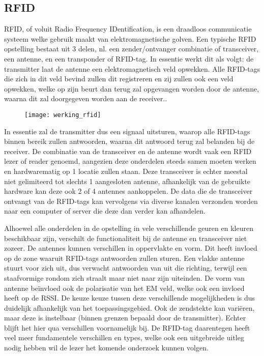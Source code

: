 \subsection{RFID}
\label{sec:RFID}
RFID, of voluit Radio Frequency IDentification, is een draadloos communicatie systeem welke gebruik maakt van elektromagnetische golven. Een typische RFID opstelling bestaat uit 3 delen, nl. een zender/ontvanger combinatie of transceiver, een antenne, en een transponder of RFID-tag.\autocite{Auxcis2022} In essentie werkt dit als volgt: de transmitter laat de antenne een elektromagnetisch veld opwekken. Alle RFID-tags die zich in dit veld bevind zullen dit registreren en zij zullen ook een veld opwekken, welke op zijn beurt dan terug zal opgevangen worden door de antenne, waarna dit zal doorgegeven worden aan de receiver.. 
\begin{figure}[h]
\texttt{[image: werking\_rfid]}
\centering
\end{figure}
In essentie zal de transmitter dus een signaal uitsturen, waarop alle RFID-tags binnen bereik zullen antwoorden, waarna dit antwoord terug zal belanden bij de receiver. De combinatie van de transceiver en de antenne wordt vaak een RFID lezer of reader genoemd, aangezien deze onderdelen steeds samen moeten werken en hardwarematig op 1 locatie zullen staan.\autocite{Amster2021}
Deze transceiver is echter meestal niet gelimiteerd tot slechts 1 aangesloten antenne, afhankelijk van de gebruikte hardware kan deze ook 2 of 4 antennes aankoppelen. De data die de transceiver ontvangt van de RFID-tags kan vervolgens via diverse kanalen verzonden worden naar een computer of server die deze dan verder kan afhandelen.

Alhoewel alle onderdelen in de opstelling in vele verschillende geuren en kleuren beschikbaar zijn, verschilt de functionaliteit bij de antenne en transceiver niet zozeer. De antennes kunnen verschillen in oppervlakte en vorm. Dit heeft invloed op de zone waaruit RFID-tags antwoorden zullen sturen. Een vlakke antenne stuurt voor zich uit, dus verwacht antwoorden van uit die richting, terwijl een staafvormige rondom zich straalt maar niet naar zijn uiteinden. De vorm van antenne beïnvloed ook de polarisatie van het EM veld, welke ook een invloed heeft op de RSSI. De keuze keuze tussen deze verschillende mogelijkheden is dus duidelijk afhankelijk van het toepassingsgebied. Ook de zendstekte kan variëren, maar deze is instelbaar (binnen grenzen bepaald door de transmitter). Echter blijft het hier qua verschillen voornamelijk bij. De RFID-tag daarentegen heeft veel meer fundamentele verschillen en types, welke ook een uitgebreide uitleg nodig hebben wil de lezer het komende onderzoek kunnen volgen.

